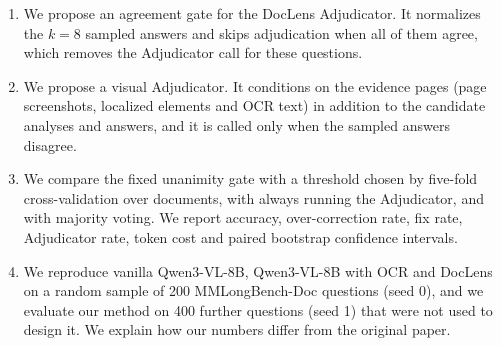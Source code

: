\begin{enumerate}
  \item We propose an agreement gate for the DocLens Adjudicator. It normalizes the $k=8$ sampled answers and skips adjudication when all of them agree, which removes the Adjudicator call for these questions.
  \item We propose a visual Adjudicator. It conditions on the evidence pages (page screenshots, localized elements and OCR text) in addition to the candidate analyses and answers, and it is called only when the sampled answers disagree.
  \item We compare the fixed unanimity gate with a threshold chosen by five-fold cross-validation over documents, with always running the Adjudicator, and with majority voting. We report accuracy, over-correction rate, fix rate, Adjudicator rate, token cost and paired bootstrap confidence intervals.
  \item We reproduce vanilla Qwen3-VL-8B, Qwen3-VL-8B with OCR and DocLens on a random sample of 200 MMLongBench-Doc questions (seed 0)\ifextended, and we evaluate our method on 400 further questions (seed 1) that were not used to design it\fi. We explain how our numbers differ from the original paper.
\end{enumerate}
